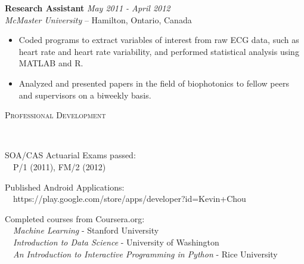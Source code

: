 \documentclass[9pt]{article}
\newenvironment{changemargin}[2]{%
  \begin{list}{}{%
    \setlength{\topsep}{0pt}%
    \setlength{\leftmargin}{#1}%
    \setlength{\rightmargin}{#2}%
    \setlength{\listparindent}{\parindent}%
    \setlength{\itemindent}{\parindent}%
    \setlength{\parsep}{\parskip}%
  }%
  \item[]}{\end{list}
}
\newcommand{\lineover}{
  \begin{changemargin}{-0.05in}{-0.05in}
    \vspace*{-8pt}
    \hrulefill \\
    \vspace*{-2pt}
  \end{changemargin}
}
\newcommand{\header}[1]{
  \begin{changemargin}{-0.5in}{-0.5in}
    {\large \scshape{#1}}\\
    \lineover
  \end{changemargin}
}
\newenvironment{body} {
  \vspace*{-16pt}
  \begin{changemargin}{-0.25in}{-0.5in}
  }
  {\end{changemargin}
}
\begin{document}
\begin{body}
  \textbf {Research Assistant} \hfill \emph{May 2011 - April 2012}\\
  \emph{McMaster University} -- Hamilton, Ontario, Canada
  \vspace*{-4pt}
  \begin{itemize} \itemsep -0pt
    \item Coded programs to extract variables of interest from raw ECG data, such
      as heart rate and heart rate variability, and performed statistical analysis
      using MATLAB and R.
    \item Analyzed and presented papers in the field of biophotonics to fellow
      peers and supervisors on a biweekly basis.
  \end{itemize}

\end{body}

\smallskip


\header{Professional Development}
\begin{body}
  \vspace{14pt}
  SOA/CAS Actuarial Exams passed: \\
  \ \ P/1 (2011), FM/2 (2012)\\




  \vspace{0.2cm}

  Published Android Applications: \\
  \ \ https://play.google.com/store/apps/developer?id=Kevin+Chou
  \vspace{0.2cm}

  Completed courses from Coursera.org:\\
  \ \ \emph{Machine Learning} - Stanford University \\
  \ \ \emph{Introduction to Data Science} - University of Washington \\
  \ \ \emph{An Introduction to Interactive Programming in Python} - Rice University \\

\end{body}
\end{document}
